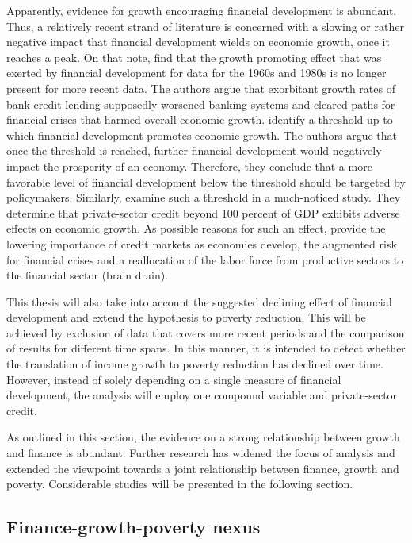 \documentclass[12pt, a4paper]{article}
\begin{document}
Apparently, evidence for growth encouraging financial development is abundant. Thus, a relatively recent strand of literature is concerned with a slowing or rather negative impact that financial development wields on economic growth, once it reaches a peak. On that note,  find that the growth promoting effect that was exerted by financial development for data for the 1960s and 1980s is no longer present for more recent data. The authors argue that exorbitant growth rates of bank credit lending supposedly worsened banking systems and cleared paths for financial crises that harmed overall economic growth.  identify a threshold up to which financial development promotes economic growth. The authors argue that once the threshold is reached, further financial development would negatively impact the prosperity of an economy. Therefore, they conclude that a more favorable level of financial development below the threshold should be targeted by policymakers. Similarly,  examine such a threshold in a much-noticed study. They determine that private-sector credit beyond 100 percent of GDP exhibits adverse effects on economic growth. As possible reasons for such an effect,  provide the lowering importance of credit markets as economies develop, the augmented risk for financial crises and a reallocation of the labor force from productive sectors to the financial sector (brain drain).

This thesis will also take into account the suggested declining effect of financial development and extend the hypothesis to poverty reduction. This will be achieved by exclusion of data that covers more recent periods and the comparison of results for different time spans. In this manner, it is intended to detect whether the translation of income growth to poverty reduction has declined over time. However, instead of solely depending on a single measure of financial development, the analysis will employ one compound variable and private-sector credit.

As outlined in this section, the evidence on a strong relationship between growth and finance is abundant. Further research has widened the focus of analysis and extended the viewpoint towards a joint relationship between finance, growth and poverty. Considerable studies will be presented in the following section.


\subsection{Finance-growth-poverty nexus} \label{f-g-p}
\end{document}
